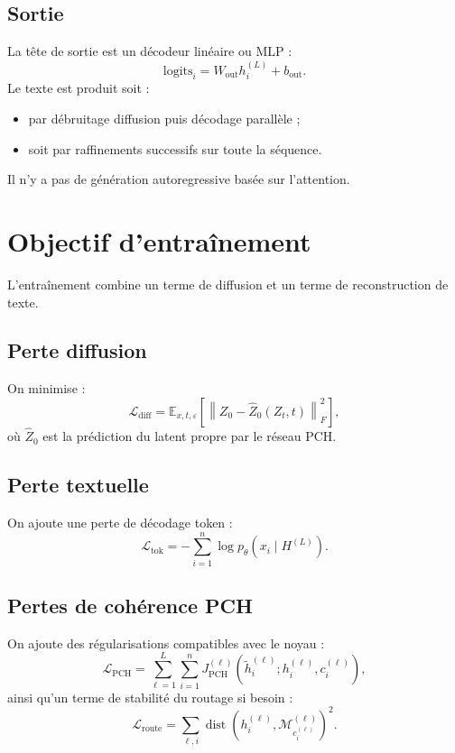 \documentclass[11pt]{article}
\begin{document}
\subsection{Sortie}

La tête de sortie est un décodeur linéaire ou MLP :
\[
\mathrm{logits}_i = W_{\mathrm{out}} h_i^{(L)} + b_{\mathrm{out}}.
\]
Le texte est produit soit :
\begin{itemize}[leftmargin=2em]
    \item par débruitage diffusion puis décodage parallèle ;
    \item soit par raffinements successifs sur toute la séquence.
\end{itemize}

Il n'y a pas de génération autoregressive basée sur l'attention.

\section{Objectif d'entraînement}

L'entraînement combine un terme de diffusion et un terme de reconstruction de texte.

\subsection{Perte diffusion}

On minimise :
\[
\mathcal L_{\mathrm{diff}}
=
\mathbb E_{x,t,\varepsilon}
\left[
\left\|
Z_0-\widehat Z_0(Z_t,t)
\right\|_F^2
\right],
\]
où \(\widehat Z_0\) est la prédiction du latent propre par le réseau PCH.

\subsection{Perte textuelle}

On ajoute une perte de décodage token :
\[
\mathcal L_{\mathrm{tok}}
=
-\sum_{i=1}^n \log p_\theta(x_i \mid H^{(L)}).
\]

\subsection{Pertes de cohérence PCH}

On ajoute des régularisations compatibles avec le noyau :
\[
\mathcal L_{\mathrm{PCH}}
=
\sum_{\ell=1}^L\sum_{i=1}^n
J_{\mathrm{PCH}}^{(\ell)}\!\left(\tilde h_i^{(\ell)}; h_i^{(\ell)}, c_i^{(\ell)}\right),
\]
ainsi qu'un terme de stabilité du routage si besoin :
\[
\mathcal L_{\mathrm{route}}
=
\sum_{\ell,i}
\operatorname{dist}\!\left(h_i^{(\ell)}, \mathcal M_{c_i^{(\ell)}}^{(\ell)}\right)^2.
\]
\end{document}
